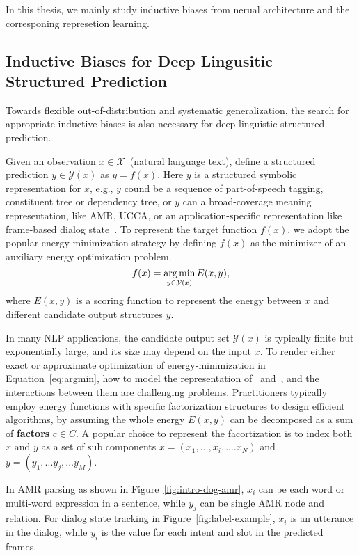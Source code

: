 In this thesis, we mainly study inductive biases from nerual
architecture and the corresponing represetion learning.

\subsection{Inductive Biases for Deep Lingusitic Structured
  Prediction}
\label{ssec:intro:bias-dsp}

Towards flexible out-of-distribution and systematic generalization,
the search for appropriate inductive biases is also necessary for
deep linguistic structured prediction.

Given an observation $x \in \mathcal{X}$~(natural language text), define
a structured prediction $y \in \mathcal{Y}(x)$ as $y=f(x)$. Here $y$ is
a structured symbolic representation for $x$, e.g., $y$ cound be a
sequence of part-of-speech tagging, constituent tree or dependency
tree, or $y$ can a broad-coverage meaning representation, like AMR,
UCCA, or an application-specific representation like frame-based
dialog state~\cite{bobrow1977gus}. To represent the target function
$f(x)$, we adopt the popular energy-minimization strategy by defining
$f(x)$ as the minimizer of an auxiliary energy optimization problem.
\begin{equation}
\label{eq:argmin}
f(x) = \operatorname*{arg\,min}_{y \in \mathcal{Y}(x)} E(x, y),
\end{equation}
where $E(x,y)$ is a scoring function to represent the energy between
$x$ and different candidate output structures $y$.

In many NLP applications, the candidate output set $\mathcal{Y}(x)$ is
typically finite but exponentially large, and its size may depend on
the input $x$. To render either exact or approximate optimization of
energy-minimization in Equation~\ref{eq:argmin}, how to model the
representation of \IN~and~\OUT, and the interactions between them are
challenging problems. Practitioners typically employ energy functions
with specific factorization structures to design efficient algorithms,
by assuming the whole energy $E(x, y)$ can be decomposed as a sum of
\textbf{factors} $c \in C$. A popular choice to represent the
facortization is to index both $x$ and $y$ as a set of sub components
$x=(x_{1},..., x_{i},.... x_{N})$ and $y=(y_{1},...y_{j},...y_{M})$.

In AMR parsing as shown in Figure~\ref{fig:intro-dog-amr},
$x_{i}$ can be each word or multi-word expression in a sentence, while
$y_{j}$ can be single AMR node and relation.  For dialog state
tracking in Figure~\ref{fig:label-example}, $x_{i}$ is an utterance in
the dialog, while $y_{i}$ is the value for each intent and slot in the
predicted frames.

